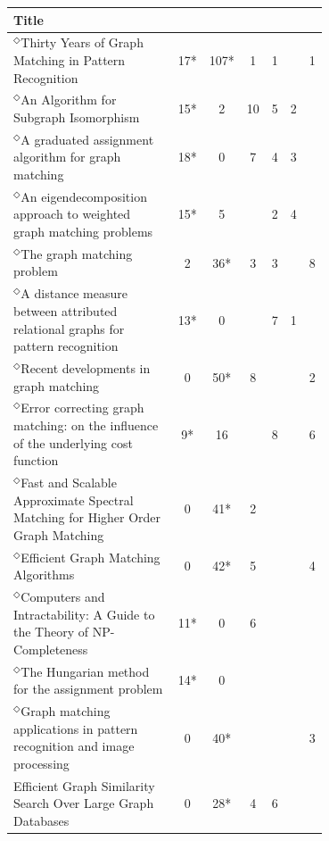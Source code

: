 \documentclass[12pt]{thesis}
\theoremstyle{plain}
\theoremstyle{definition}
\theoremstyle{remark}
\begin{document}
\begin{table}[H]
{\fontsize{10}{13}\selectfont
\begin{tabular}{|L{0.7\linewidth}|c|c|c|c|c|c|}
\hline
Title &  &   &  &   &   &  \\ \hline\hline
$^\Diamond$Thirty Years of Graph Matching in Pattern Recognition  \cite{Conte_2004} & 17* & 107* & 1 & 1 &  & 1 \\ \hline
$^\Diamond$An Algorithm for Subgraph Isomorphism  \cite{Ullmann_1976} & 15* & 2 & 10 & 5 & 2 &  \\ \hline
$^\Diamond$A graduated assignment algorithm for graph matching  \cite{Gold_1996} & 18* & 0 & 7 & 4 & 3 &  \\ \hline
$^\Diamond$An eigendecomposition approach to weighted graph matching problems  \cite{Umeyama_1988} & 15* & 5 &  & 2 & 4 &  \\ \hline
$^\Diamond$The graph matching problem  \cite{Livi_2012} & 2 & 36* & 3 & 3 &  & 8 \\ \hline
$^\Diamond$A distance measure between attributed relational graphs for pattern recognition  \cite{Sanfeliu_1983} & 13* & 0 &  & 7 & 1 &  \\ \hline
$^\Diamond$Recent developments in graph matching  \cite{Bunke_2000} & 0 & 50* & 8 &  &  & 2 \\ \hline
$^\Diamond$Error correcting graph matching: on the influence of the underlying cost function  \cite{Bunke_1999} & 9* & 16 &  & 8 &  & 6 \\ \hline
$^\Diamond$Fast and Scalable Approximate Spectral Matching for Higher Order Graph Matching  \cite{Park_2014} & 0 & 41* & 2 &  &  &  \\ \hline
$^\Diamond$Efficient Graph Matching Algorithms  \cite{Messmer_1995} & 0 & 42* & 5 &  &  & 4 \\ \hline
$^\Diamond$Computers and Intractability: A Guide to the Theory of NP-Completeness  \cite{Hartmanis_1982} & 11* & 0 & 6 &  &  &  \\ \hline
$^\Diamond$The Hungarian method for the assignment problem  \cite{Kuhn_1955} & 14* & 0 &  &  &  &  \\ \hline
$^\Diamond$Graph matching applications in pattern recognition and image processing  \cite{Conte_2003} & 0 & 40* &  &  &  & 3 \\ \hline
Efficient Graph Similarity Search Over Large Graph Databases  \cite{Zheng_2015} & 0 & 28* & 4 & 6 &  &  \\ \hline

\end{tabular}}
\end{table}
\end{document}
